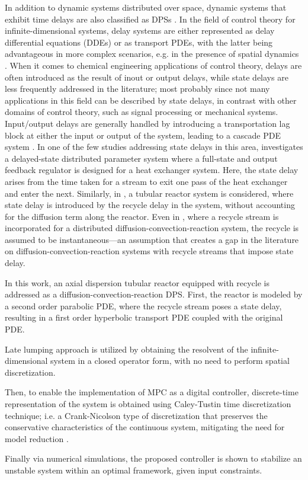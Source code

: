 In addition to dynamic systems distributed over space, dynamic systems that exhibit time delays are also classified as DPSs \cite{curtainbook}. 
In the field of control theory for infinite-dimensional systems, delay systems are either represented as delay differential equations (DDEs) or as transport PDEs, with the latter being advantageous in more complex scenarios, e.g. in the presence of spatial dynamics \cite{krstic2009book}. 
When it comes to chemical engineering applications of control theory, delays are often introduced as the result of inout or output delays, while state delays are less frequently addressed in the literature; most probably since not many applications in this field can be described by state delays, in contrast with other domains of control theory, such as signal processing or mechanical systems. 
Input/output delays are generally handled by introducing a transportation lag block at either the input or output of the system, leading to a cascade PDE system \cite{Hiratsuka1969IEEE, mohammadi2012lq, Guilherme2019ACC}. 
In one of the few studies addressing state delays in this area, \cite{ozorio2019heat} investigates a delayed-state distributed parameter system where a full-state and output feedback regulator is designed for a heat exchanger system. 
Here, the state delay arises from the time taken for a stream to exit one pass of the heat exchanger and enter the next. 
Similarly, in \cite{qi2021output}, a tubular reactor system is considered, where state delay is introduced by the recycle delay in the system, without accounting for the diffusion term along the reactor. 
Even in \cite{khatibi2021model}, where a recycle stream is incorporated for a distributed diffusion-convection-reaction system, the recycle is assumed to be instantaneous—an assumption that creates a gap in the literature on diffusion-convection-reaction systems with recycle streams that impose state delay.



In this work, an axial dispersion tubular reactor equipped with recycle is addressed as a diffusion-convection-reaction DPS. First, the reactor is modeled by a second order parabolic PDE, where the recycle stream poses a state delay, resulting in a first order hyperbolic transport PDE coupled with the original PDE. 

Late lumping approach is utilized by obtaining the resolvent of the infinite-dimensional system in a closed operator form, with no need to perform spatial discretization. 

Then, to enable the implementation of MPC as a digital controller, discrete-time representation of the system is obtained using Caley-Tustin time discretization technique; i.e. a Crank-Nicolson type of discretization that preserves the conservative characteristics of the continuous system, mitigating the need for model reduction \cite{havu2007cayley, xu2017linear}. 

Finally via numerical simulations, the proposed controller is shown to stabilize an unstable system within an optimal framework, given input constraints.